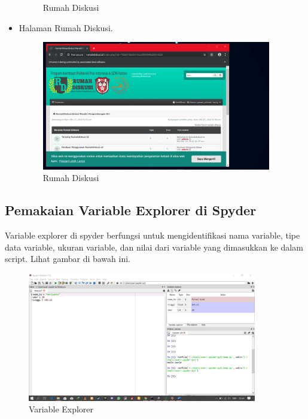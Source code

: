 \documentclass{article}
\begin{document}
\begin{itemize}
\begin{figure}[!htbp]
	\caption{Rumah Diskusi}
\end{figure}
\item Halaman Rumah Diskusi.
\begin{figure}[!htbp]
	\centering
	\includegraphics[width=10cm]{figures/selenium8.png}
	\caption{Rumah Diskusi}
\end{figure}
\end{itemize}

\subsection{Pemakaian Variable Explorer di Spyder}
Variable explorer di spyder berfungsi untuk mengidentifikasi nama variable, tipe data variable, ukuran variable, dan nilai dari variable yang dimasukkan ke dalam script. Lihat gambar di bawah ini.
\begin{figure}[!htbp]
	\centering
	\includegraphics[width=10cm]{figures/varex.png}
	\caption{Variable Explorer}
\end{figure}
\end{document}
